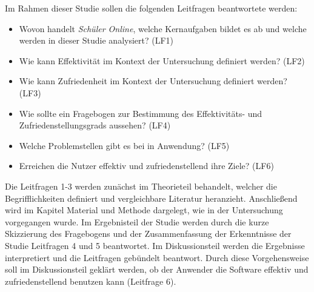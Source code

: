 Im Rahmen dieser Studie sollen die folgenden Leitfragen beantwortete werden: 
\begin{itemize}
    \item Wovon handelt \textit{Schüler Online}, welche Kernaufgaben bildet es ab und welche werden in dieser Studie analysiert? (LF1)%
    \item Wie kann Effektivität im Kontext der Untersuchung definiert werden? (LF2)%
    \item Wie kann Zufriedenheit im Kontext der Untersuchung definiert werden? (LF3)%
    \item Wie sollte ein Fragebogen zur Bestimmung des Effektivitäts- und Zufriedenstellungsgrads aussehen? (LF4)%
    \item Welche Problemstellen gibt es bei in Anwendung? (LF5)%
    \item Erreichen die Nutzer effektiv und zufriedenstellend ihre Ziele? (LF6)%
\end{itemize}

Die Leitfragen 1-3 werden zunächst im Theorieteil behandelt, welcher die Begrifflichkeiten definiert und vergleichbare Literatur heranzieht. Anschließend wird im Kapitel Material und Methode dargelegt, wie in der Untersuchung vorgegangen wurde. Im Ergebnisteil der Studie werden durch die kurze Skizzierung des Fragebogens und der Zusammenfassung der Erkenntnisse der Studie Leitfragen 4 und 5 beantwortet. Im Diskussionsteil werden die Ergebnisse interpretiert und die Leitfragen gebündelt beantwort. Durch diese Vorgehensweise soll im Diskussionsteil geklärt werden, ob der Anwender die Software effektiv und zufriedenstellend benutzen kann (Leitfrage 6).

